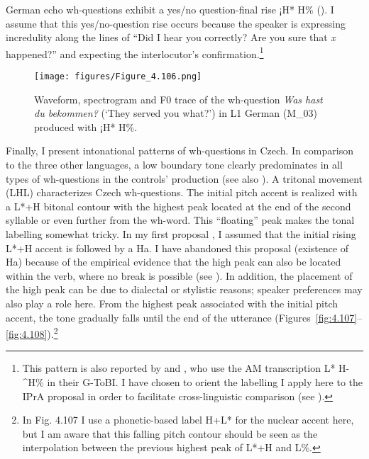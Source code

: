German echo wh-questions exhibit a yes/no question-final rise ¡H* H\% (). I assume that this yes/no-question rise occurs because the speaker is expressing incredulity along the lines of “Did I hear you correctly? Are you sure that \textit{x} happened?” and expecting the interlocutor’s confirmation.\footnote{This pattern is also reported by \citet{vonEssen1964} and \citet{GriceBaumann2002}, who use the AM transcription L* H-\^{}H\% in their G-ToBI. I have chosen to orient the labelling I apply here to the IPrA proposal in order to facilitate cross-linguistic comparison (see \citealt{PrietoEtAl2015b,PrietoEtAl2015c}).}

\begin{figure}


\texttt{[image: figures/Figure\_4.106.png]}



\caption{Waveform, spectrogram and F0 trace of the wh-question \textit{Was hast du bekommen?} (‘They served you what?’) in L1 German (\mbox{M\_03}) produced with ¡H* H\%.}
\label{fig:4.106}
\end{figure}

\begin{sloppypar}
Finally, I present intonational patterns of wh-questions in Czech. In comparison to the three other languages, a low boundary tone clearly predominates in all types of wh-questions in the controls’ production (see also \citealt{Daneš1949, PeškováForthcoming}). A tritonal movement (LHL) characterizes Czech wh-questions. The initial pitch accent is realized with a L*+H bitonal contour with the highest peak located at the end of the second syllable or even further from the wh-word. This “floating” peak makes the tonal labelling somewhat tricky. In my first proposal \citep{Pešková2017}, I assumed that the initial rising L*+H accent is followed by a Ha. I have abandoned this proposal (existence of Ha) because of the empirical evidence that the high peak can also be located within the verb, where no break is possible (see \citealt{PeškováForthcoming}). In addition, the placement of the high peak can be due to dialectal or stylistic reasons; speaker preferences may also play a role here. From the highest peak associated with the initial pitch accent, the tone gradually falls until the end of the utterance (Figures~\ref{fig:4.107}--\ref{fig:4.108}).{\footnote{In Fig. 4.107 I use a phonetic-based label H+L* for the nuclear accent here, but I am aware that this falling pitch contour should be seen as the interpolation between the previous highest peak of L*+H and L\%.}}
\end{sloppypar}


